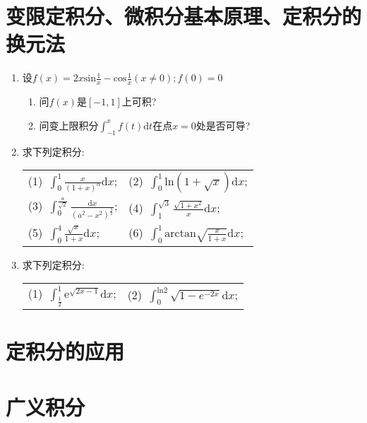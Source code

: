 \section{变限定积分、微积分基本原理、定积分的换元法}
\begin{enumerate}
	\item 设$f(x)=2x\mathrm{sin}\frac{1}{x}-\mathrm{cos}\frac{1}{x}(x\ne 0);f(0)=0$
	\begin{enumerate}
		\item 问$f(x)$是$[-1,1]$上可积?
		\item 问变上限积分$\displaystyle{\int_{-1}^{x}f(t)\mathrm{d}t}$在点$x=0$处是否可导?
	\end{enumerate}
	\item 求下列定积分:
	\begin{table}[H]
		\begin{tabular}{ll}
			(1)\ $\displaystyle{\int_{0}^{1}\frac{x}{(1+x)^\alpha}\mathrm{d}x}$;\qquad \qquad \qquad&(2)\ $\displaystyle{\int_{0}^{1}\mathrm{ln}(1+\sqrt{x})\mathrm{d}x}$;\\
			(3)\ $\displaystyle{\int_{0}^{\frac{a}{\sqrt{2}}}\frac{\mathrm{d}x}{(a^2-x^2)^{\frac{3}{2}}}}$;\qquad \qquad \qquad&(4)\ $\displaystyle{\int_{1}^{\sqrt{3}}\frac{\sqrt{1+x^2}}{x}\mathrm{d}x}$;\\
			(5)\ $\displaystyle{\int_{0}^{4}\frac{\sqrt{x}}{1+x}\mathrm{d}x}$;\qquad \qquad \qquad &(6)\
			 $\displaystyle{\int_{0}^{1}\mathrm{arctan}\sqrt{\frac{x}{1+x}}\mathrm{d}x}$;
		\end{tabular}
	\end{table}
	\item 求下列定积分:
		\begin{table}[H]
		\begin{tabular}{ll}
			(1)\ $\displaystyle{\int_{\frac{1}{2}}^{1}\mathrm{e}^{\sqrt{2x-1}}\mathrm{d}x}$;\qquad \qquad \qquad &(2)\ $\displaystyle{\int_{0}^{\mathrm{ln}2}\sqrt{1-e^{-2x}}\mathrm{d}x}$;
		\end{tabular}
	\end{table}
\end{enumerate}

\section{定积分的应用}

\section{广义积分}